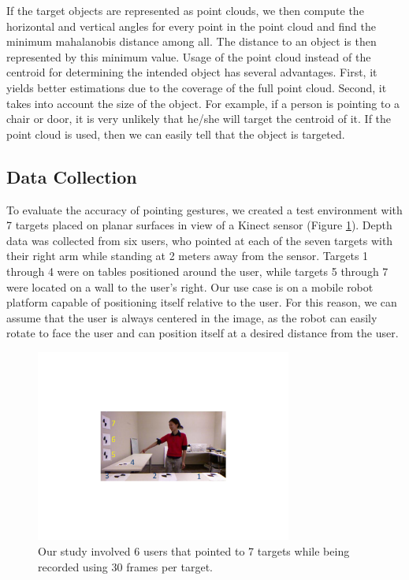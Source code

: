 If the target objects are represented as point clouds, we then compute the horizontal and vertical angles for every point in the point cloud and find the minimum mahalanobis distance among all. The distance to an object is then represented by this minimum value. Usage of the point cloud instead of the centroid for determining the intended object has several advantages. First, it yields better estimations due to the coverage of the full point cloud. Second, it takes into account the size of the object. For example, if a person is pointing to a chair or door, it is very unlikely that he/she will target the centroid of it. If the point cloud is used, then we can easily tell that the object is targeted.

 
\subsection{Data Collection}
\label{sec:pointing_data_collection}

To evaluate the accuracy of pointing gestures, we created a test environment with 7 targets placed on planar surfaces in view of a Kinect sensor (Figure \ref{fig:ground_truth_targets}). Depth data was collected from six users, who pointed at each of the seven targets with their right arm while standing at 2 meters away from the sensor. Targets 1 through 4 were on tables positioned around the user, while targets 5 through 7 were located on a wall to the user's right. Our use case is on a mobile robot platform capable of positioning itself relative to the user.  For this reason, we can assume that the user is always centered in the image, as the robot can easily rotate to face the user and can position itself at a desired distance from the user.

\begin{figure}[ht!]
\centering
\includegraphics[width=0.75\textwidth]{pics/data_collection_crop}
\caption{Our study involved 6 users that pointed to 7 targets while being recorded using 30 frames per target.}
\label{fig:ground_truth_targets}
\end{figure}

